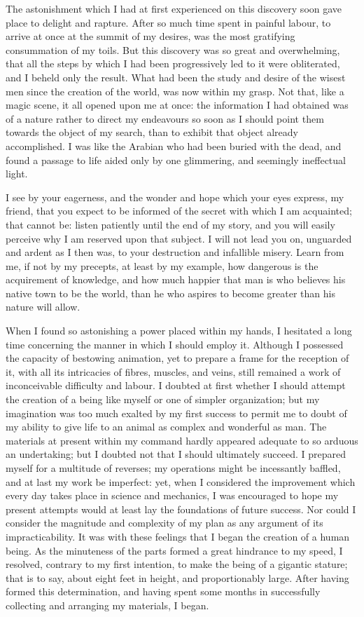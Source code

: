 The astonishment which I had at first
experienced on this discovery soon gave
place to delight and rapture. After so
much time spent in painful labour, to arrive
at once at the summit of my desires,
was the most gratifying consummation of
my toils. But this discovery was so great
and overwhelming, that all the steps by
which I had been progressively led to
it were obliterated, and I beheld only
the result. What had been the study
and desire of the wisest men since the
creation of the world, was now within
my grasp. Not that, like a magic
scene, it all opened upon me at once:
the information I had obtained was of
a nature rather to direct my endeavours
so soon as I should point them towards
the object of my search, than to exhibit
that object already accomplished. I
was like the Arabian who had been
buried with the dead, and found a
passage to life aided only by one
glimmering, and seemingly ineffectual
light.

I see by your eagerness, and the
wonder and hope which your eyes express,
my friend, that you expect to
be informed of the secret with which
I am acquainted; that cannot be: listen
patiently until the end of my story,
and you will easily perceive why I am
reserved upon that subject. I will not
lead you on, unguarded and ardent as
I then was, to your destruction and
infallible misery. Learn from me, if
not by my precepts, at least by my example,
how dangerous is the acquirement
of knowledge, and how much
happier that man is who believes his
native town to be the world, than he
who aspires to become greater than his
nature will allow.

When I found so astonishing a power
placed within my hands, I hesitated a
long time concerning the manner in
which I should employ it. Although
I possessed the capacity of bestowing
animation, yet to prepare a frame for
the reception of it, with all its intricacies
of fibres, muscles, and veins, still
remained a work of inconceivable difficulty
and labour. I doubted at first
whether I should attempt the creation
of a being like myself or one of simpler
organization; but my imagination
was too much exalted by my first success
to permit me to doubt of my ability
to give life to an animal as complex
and wonderful as man. The materials
at present within my command hardly
appeared adequate to so arduous an
undertaking; but I doubted not that
I should ultimately succeed. I prepared
myself for a multitude of reverses;
my operations might be incessantly
baffled, and at last my work be
imperfect: yet, when I considered the
improvement which every day takes
place in science and mechanics, I was
encouraged to hope my present attempts
would at least lay the foundations
of future success. Nor could I
consider the magnitude and complexity
of my plan as any argument of its impracticability.
It was with these feelings
that I began the creation of a human
being. As the minuteness of the
parts formed a great hindrance to my
speed, I resolved, contrary to my first
intention, to make the being of a gigantic
stature; that is to say, about
eight feet in height, and proportionably
large. After having formed this determination,
and having spent some
months in successfully collecting and
arranging my materials, I began.

